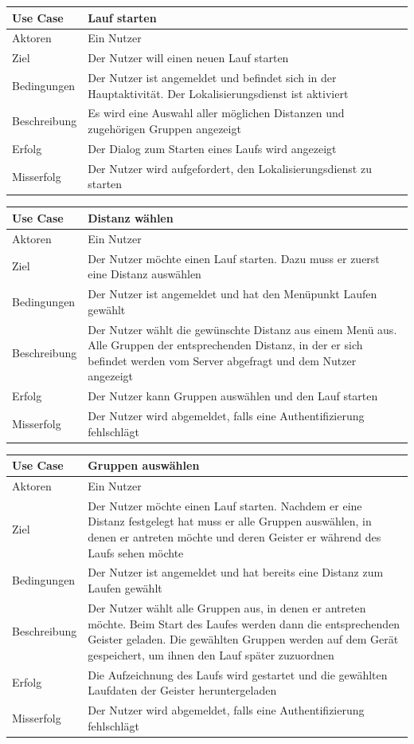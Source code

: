 \begin{tabular}{|p{}|p{}|}
\hline
\textbf{Use Case} & \textbf{Lauf starten} \\ \hline \hline
Aktoren &  Ein Nutzer \\ \hline
Ziel &  Der Nutzer will einen neuen Lauf starten \\ \hline
Bedingungen &  Der Nutzer ist angemeldet und befindet sich in der Hauptaktivität. Der Lokalisierungsdienst ist aktiviert \\ \hline
Beschreibung &  Es wird eine Auswahl aller möglichen Distanzen und zugehörigen Gruppen angezeigt\\ \hline
Erfolg & Der Dialog zum Starten eines Laufs wird angezeigt \\ \hline
Misserfolg & Der Nutzer wird aufgefordert, den Lokalisierungsdienst zu starten \\ \hline
\hline \end{tabular}
\begin{tabular}{|p{}|p{}|}
\hline
\textbf{Use Case} & \textbf{Distanz wählen} \\ \hline \hline
Aktoren &  Ein Nutzer \\ \hline
Ziel &  Der Nutzer möchte einen Lauf starten. Dazu muss er zuerst eine Distanz auswählen \\ \hline
Bedingungen &  Der Nutzer ist angemeldet und hat den Menüpunkt Laufen gewählt \\ \hline
Beschreibung & Der Nutzer wählt die gewünschte Distanz aus einem Menü aus. Alle Gruppen der entsprechenden Distanz, in der er sich befindet werden vom Server abgefragt und dem Nutzer angezeigt \\ \hline
Erfolg & Der Nutzer kann Gruppen auswählen und den Lauf starten\\ \hline
Misserfolg & Der Nutzer wird abgemeldet, falls eine Authentifizierung fehlschlägt \\ \hline
\hline \end{tabular}
\begin{tabular}{|p{}|p{}|}
\hline
\textbf{Use Case} & \textbf{Gruppen auswählen} \\ \hline \hline
Aktoren &  Ein Nutzer \\ \hline
Ziel &  Der Nutzer möchte einen Lauf starten. Nachdem er eine Distanz festgelegt hat muss er alle Gruppen auswählen, in denen er antreten möchte und deren Geister er während des Laufs sehen möchte \\ \hline
Bedingungen &  Der Nutzer ist angemeldet und hat bereits eine Distanz zum Laufen gewählt \\ \hline
Beschreibung & Der Nutzer wählt alle Gruppen aus, in denen er antreten möchte. Beim Start des Laufes werden dann die entsprechenden Geister geladen. Die gewählten Gruppen werden auf dem Gerät gespeichert, um ihnen den Lauf später zuzuordnen \\ \hline
Erfolg & Die Aufzeichnung des Laufs wird gestartet und die gewählten Laufdaten der Geister heruntergeladen \\ \hline
Misserfolg & Der Nutzer wird abgemeldet, falls eine Authentifizierung fehlschlägt \\ \hline
\hline \end{tabular}
